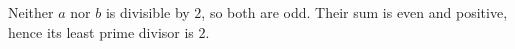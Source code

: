 Neither $a$ nor $b$ is divisible by $2$, so both are odd. Their sum is even and positive, hence its least prime divisor is $\boxed2$.
